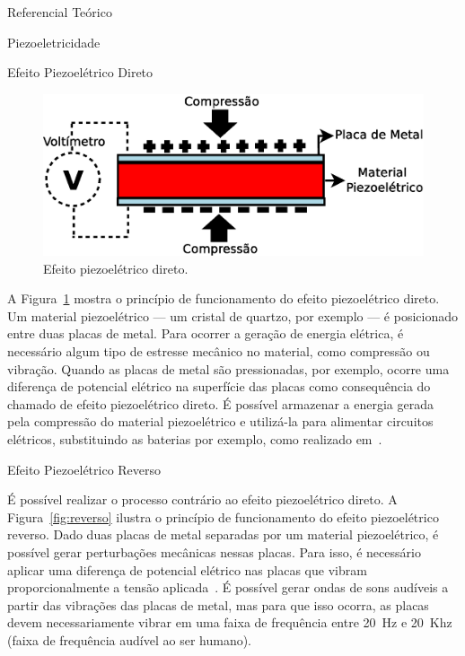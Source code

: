 \begin{chapter}{Referencial Teórico}
\begin{section}{Piezoeletricidade}
\begin{subsection}{Efeito Piezoelétrico Direto}
\begin{figure}[!h]
	\centering
	\begin{minipage}[c]{\textwidth}
	\centering
	\includegraphics[width=0.9\linewidth]{fig/EfeitoPiezoEletricoDireto}
	\caption{Efeito piezoelétrico direto.}
	\label{fig:direto}
	\end{minipage}
\end{figure}

A Figura~\ref{fig:direto} mostra o princípio de funcionamento do efeito
piezoelétrico direto. Um material piezoelétrico --- um cristal de quartzo, por
exemplo --- é posicionado entre duas placas de metal. Para ocorrer a geração de
energia elétrica, é necessário algum tipo de estresse mecânico no material, como
compressão ou vibração. Quando as placas de metal são pressionadas, por exemplo,
ocorre uma diferença de potencial elétrico na superfície das placas como
consequência do chamado de efeito piezoelétrico direto.  É possível armazenar a
energia gerada pela compressão do material piezoelétrico e utilizá-la para
alimentar circuitos elétricos, substituindo as baterias por exemplo, como
realizado em~\cite{twitter}. 

\end{subsection}


\begin{subsection}{Efeito Piezoelétrico Reverso}

É possível realizar o processo contrário ao efeito piezoelétrico direto. A
Figura~\ref{fig:reverso} ilustra o princípio de funcionamento do efeito
piezoelétrico reverso. Dado duas placas de metal separadas por um material
piezoelétrico, é possível gerar perturbações mecânicas nessas placas. Para isso,
é necessário aplicar uma diferença de potencial elétrico nas placas que vibram
proporcionalmente a tensão aplicada~\cite{Lin12}. É possível gerar ondas de sons
audíveis a partir das vibrações das placas de metal, mas para que isso ocorra,
as placas devem necessariamente vibrar em uma faixa de frequência entre 20~Hz e
20~Khz (faixa de frequência audível ao ser humano).



\end{subsection}
\end{section}
\end{chapter}
